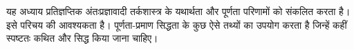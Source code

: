\documentclass[../../../include/open-logic-chapter]{subfiles}
\begin{document}

\begin{editorial}
  यह अध्याय प्रतिज्ञप्तिक अंतःप्रज्ञावादी तर्कशास्त्र के यथार्थता और पूर्णता
  परिणामों को संकलित करता है। इसे परिचय की आवश्यकता है। पूर्णता-प्रमाण
  सिद्धता के कुछ ऐसे तथ्यों का उपयोग करता है जिन्हें कहीं स्पष्टतः कथित और
  सिद्ध किया जाना चाहिए।
\end{editorial}


\OLEndChapterHook
\end{document}
